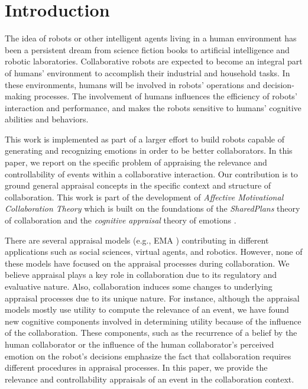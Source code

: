 \documentclass{aamas2016_extendedabstract}
\begin{document}

\section{Introduction}

The idea of robots or other intelligent agents living in a human environment has
been a persistent dream from science fiction books to artificial intelligence
and robotic laboratories. Collaborative robots are expected to become an
integral part of humans' environment to accomplish their industrial and
household tasks. In these environments, humans will be involved in robots'
operations and decision-making processes. The involvement of humans influences
the efficiency of robots' interaction and performance, and makes the robots
sensitive to humans' cognitive abilities and behaviors.

This work is implemented as part of a larger effort to build robots capable of
generating and recognizing emotions in order to be better collaborators. In this
paper, we report on the specific problem of appraising the relevance and
controllability of events within a collaborative interaction. Our contribution
is to ground general appraisal concepts in the specific context and structure of
collaboration. This work is part of the development of \textit{Affective
Motivational Collaboration Theory} which is built on the foundations of the
\textit{SharedPlans} theory of collaboration \cite{grosz:plans-discourse} and
the \textit{cognitive appraisal} theory of emotions
\cite{gratch:domain-independent}.

There are several appraisal models (e.g., EMA \cite{marsella:ema-process-model})
contributing in different applications such as social sciences, virtual agents,
and robotics. However, none of these models have focused on the appraisal
processes during collaboration. We believe appraisal plays a key role in
collaboration due to its regulatory and evaluative nature. Also, collaboration
induces some changes to underlying appraisal processes due to its unique nature.
For instance, although the appraisal models mostly use utility to compute the
relevance of an event, we have found new cognitive components involved in
determining utility because of the influence of the collaboration. These
components, such as the recurrence of a belief by the human collaborator or the
influence of the human collaborator's perceived emotion on the robot's decisions
emphasize the fact that collaboration requires different procedures in appraisal
processes. In this paper, we provide the relevance and controllability
appraisals of an event in the collaboration context.
\end{document}
